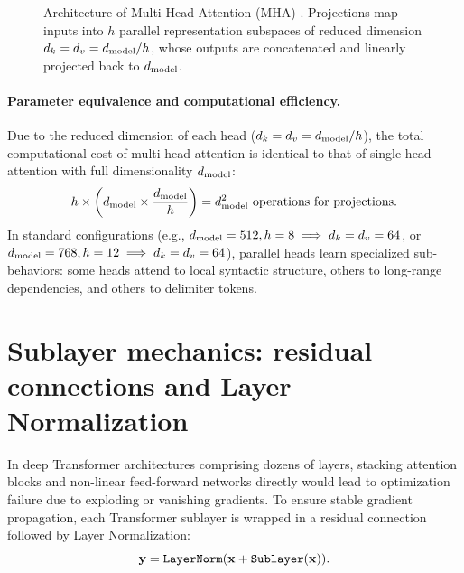\documentclass[../../main.tex]{subfiles}
\begin{document}
\begin{figure}[htbp]
\caption{Architecture of Multi-Head Attention (MHA) \cite{vaswani2017}. Projections map inputs into $h$ parallel representation subspaces of reduced dimension $d_k = d_v = d_{\text{model}} / h$, whose outputs are concatenated and linearly projected back to $d_{\text{model}}$.}
\label{fig:multi_head_attention_tikz}
\end{figure}

\paragraph{Parameter equivalence and computational efficiency.}
Due to the reduced dimension of each head ($d_k = d_v = d_{\text{model}} / h$), the total computational cost of multi-head attention is identical to that of single-head attention with full dimensionality $d_{\text{model}}$:
\begin{equation}
h \times \left( d_{\text{model}} \times \frac{d_{\text{model}}}{h} \right) = d_{\text{model}}^2 \text{ operations for projections}.
\end{equation}
In standard configurations (e.g., $d_{\text{model}} = 512, h = 8 \implies d_k = d_v = 64$, or $d_{\text{model}} = 768, h = 12 \implies d_k = d_v = 64$), parallel heads learn specialized sub-behaviors: some heads attend to local syntactic structure, others to long-range dependencies, and others to delimiter tokens.

\clearpage
\section{Sublayer mechanics: residual connections and Layer Normalization}
\label{sec:sublayer_mechanics}

In deep Transformer architectures comprising dozens of layers, stacking attention blocks and non-linear feed-forward networks directly would lead to optimization failure due to exploding or vanishing gradients. To ensure stable gradient propagation, each Transformer sublayer is wrapped in a residual connection followed by Layer Normalization:
\begin{equation}
\label{eq:add_and_norm_post}
\mathbf{y} = \text{\texttt{LayerNorm}}(\mathbf{x} + \text{\texttt{Sublayer}}(\mathbf{x})).
\end{equation}
\end{document}
